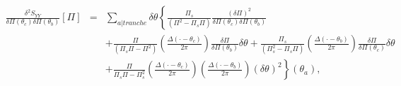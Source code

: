 	{\color{lightgray}
	
	\begin{eqnarray}
		\frac{ \delta^2 S_{YY} }{ \delta \Pi(\theta_c) \delta \Pi(\theta_b)  } [\Pi ]  & = & \sum_{a \vert tranche}   \delta \theta \left \{  \frac{\Pi_s}{(\Pi^2  - \Pi_s\Pi)} \frac{(\delta \Pi)^2}{ \delta \Pi(\theta_c) \delta \Pi(\theta_b)  } \right . \\
		&  & +  \left . \frac{\Pi }{(\Pi_s\Pi -\Pi^2) } \left ( \frac{\Delta ( \cdot - \theta_c )}{2\pi}   \right ) \frac{\delta \Pi}{\delta \Pi(\theta_b)} \delta \theta+ \frac{\Pi_s }{( \Pi_s^2 - \Pi_s \Pi) } \left (  \frac{\Delta ( \cdot - \theta_b )}{2\pi} \right ) \frac{\delta \Pi}{\delta \Pi(\theta_c)} \delta \theta \right . \\
		& &  + \left .  \frac{\Pi }{\Pi_s\Pi - \Pi_s^2 }\left (  \frac{\Delta ( \cdot - \theta_c )}{2\pi} \right )\left (  \frac{\Delta ( \cdot - \theta_b )}{2\pi} \right )( \delta \theta)^2  \right \}(\theta_a),	
	\end{eqnarray}
	
	
		


		
%	
	
	
}
